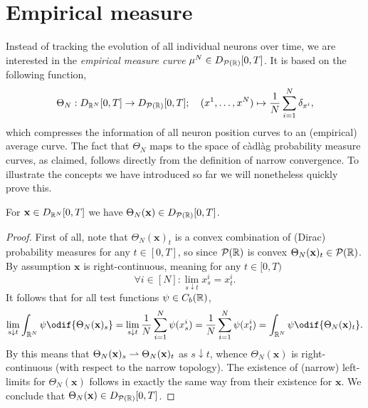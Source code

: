 \section{Empirical measure}

Instead of tracking the evolution of all individual neurons over time, we are interested in the \textit{empirical measure curve} \(\mu^N \in D_{\mathcal{P}(\mathbb{R})}[0,T]\).
It is based on the following function,
\begin{equation}
  \Theta_N : D_{\mathbb{R}^N}[0,T] \to D_{\mathcal{P}(\mathbb{R})}[0,T]; \quad (x^1,\dots,x^N) \mapsto \frac{1}{N} \sum_{i=1}^N \delta_{x^i},
\end{equation}
which compresses the information of all neuron position curves to an (empirical) average curve.
The fact that \(\Theta_N\) maps to the space of càdlàg probability measure curves, as claimed, follows directly from the definition of narrow convergence.
To illustrate the concepts we have introduced so far we will nonetheless quickly prove this.
\begin{lemma}\label{lem:range-of-Theta}
  For \(\mathbf{x} \in D_{\mathbb{R}^N}[0,T]\) we have \(\Theta_N(\mathbf{x}) \in D_{\mathcal{P}(\mathbb{R})}[0,T]\).
\end{lemma}

\begin{proof}
  First of all, note that \(\Theta_N(\bm{x})_t\) is a convex combination of (Dirac) probability measures for any \(t \in [0,T]\), so since \(\mathcal{P}(\mathbb{R})\) is convex \(\Theta_N(\mathbf{x})_t \in \mathcal{P}(\mathbb{R})\).
  By assumption \(\bm{x}\) is right-continuous, meaning for any \(t \in [0,T)\)
  \begin{equation}
    \forall i \in [N] : \lim_{s \downarrow t} x_s^i = x_t^i.
  \end{equation}
  It follows that for all test functions \(\psi \in C_b(\mathbb{R})\),
  \begin{equation}
    \lim_{s \downarrow t} \int_{\potspace^N} \psi \odif{\Theta_N(\bm{x})_s}
    = \lim_{s \downarrow t} \frac{1}{N} \sum_{i=1}^N \psi(x_s^i)
    = \frac{1}{N} \sum_{i=1}^N \psi(x_t^i)
    = \int_{\potspace^N} \psi \odif{\Theta_N(\bm{x})_t}.
  \end{equation}
  By  this means that \(\Theta_N(\mathbf{x})_s \rightharpoonup \Theta_N(\mathbf{x})_t\) as \(s \downarrow t\), whence \(\Theta_N(\bm{x})\) is right-continuous (with respect to the narrow topology).
  The existence of (narrow) left-limits for \(\Theta_N(\bm{x})\) follows in exactly the same way from their existence for \(\bm{x}\).
  We conclude that \(\Theta_N(\mathbf{x}) \in D_{\mathcal{P}(\mathbb{R})}[0,T]\).
\end{proof}

